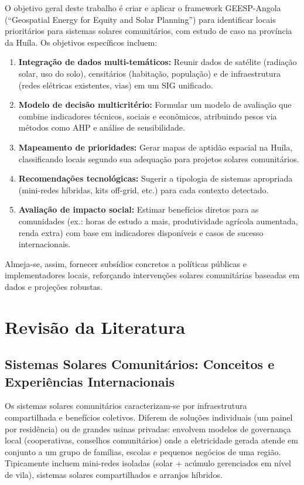 \documentclass[12pt, a4paper]{article}
\begin{document}
O objetivo geral deste trabalho é criar e aplicar o framework GEESP-Angola (``Geospatial Energy for Equity and Solar Planning'') para identificar locais prioritários para sistemas solares comunitários, com estudo de caso na província da Huíla. Os objetivos específicos incluem:

\begin{enumerate}
\item \textbf{Integração de dados multi-temáticos:} Reunir dados de satélite (radiação solar, uso do solo), censitários (habitação, população) e de infraestrutura (redes elétricas existentes, vias) em um SIG unificado.
\item \textbf{Modelo de decisão multicritério:} Formular um modelo de avaliação que combine indicadores técnicos, sociais e econômicos, atribuindo pesos via métodos como AHP e análise de sensibilidade.
\item \textbf{Mapeamento de prioridades:} Gerar mapas de aptidão espacial na Huíla, classificando locais segundo sua adequação para projetos solares comunitários.
\item \textbf{Recomendações tecnológicas:} Sugerir a tipologia de sistemas apropriada (mini-redes híbridas, kits off-grid, etc.) para cada contexto detectado.
\item \textbf{Avaliação de impacto social:} Estimar benefícios diretos para as comunidades (ex.: horas de estudo a mais, produtividade agrícola aumentada, renda extra) com base em indicadores disponíveis e casos de sucesso internacionais.
\end{enumerate}

Almeja-se, assim, fornecer subsídios concretos a políticas públicas e implementadores locais, reforçando intervenções solares comunitárias baseadas em dados e projeções robustas.

\section{Revisão da Literatura}

\subsection{Sistemas Solares Comunitários: Conceitos e Experiências Internacionais}

Os sistemas solares comunitários caracterizam-se por infraestrutura compartilhada e benefícios coletivos. Diferem de soluções individuais (um painel por residência) ou de grandes usinas privadas: envolvem modelos de governança local (cooperativas, conselhos comunitários) onde a eletricidade gerada atende em conjunto a um grupo de famílias, escolas e pequenos negócios de uma região. Tipicamente incluem mini-redes isoladas (solar + acúmulo gerenciados em nível de vila), sistemas solares compartilhados e arranjos híbridos.
\end{document}
